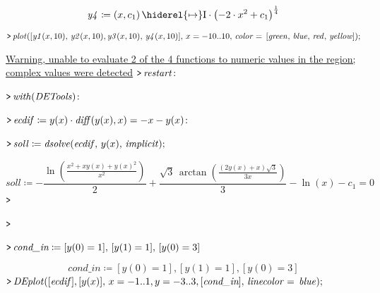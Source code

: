 \documentclass{article}
\begin{document}
\begin{dmath}\label{(10)}
\mathit{y4} \coloneqq \left(x ,c_{1}\right)\hiderel{\mapsto }\mathrm{I}\cdot \left(-2\cdot x^{2}+c_{1}\right)^{\frac{1}{4}}
\end{dmath}
\mapleinput
{$ \displaystyle \texttt{>\,} \mathit{plot} ([\mathit{y1} (x ,10),\,\mathit{y2} (x ,10),\mathit{y3} (x ,10),\,\mathit{y4} (x ,10)],\,x =-10..10,\,\mathit{color} =\,[\mathit{green} ,\,\mathit{blue} ,\,\mathit{red} ,\,\mathit{yellow}]); $}

\href{http://www.maplesoft.com/support/help/errors/view.aspx?path=Warning,%20unable%20to%20evaluate%202%20of%20the%204%20functions%20to%20numeric%20values%20in%20the%20region%3B%20complex%20values%20were%20detected}{Warning, unable to evaluate 2 of the 4 functions to numeric values in the region; complex values were detected}%
{}
\mapleinput
{$ \displaystyle \texttt{>\,} \mathit{restart} \colon  $}

\mapleinput
{$ \displaystyle \texttt{>\,} \mathit{with} (\mathit{DETools})\colon  $}

\mapleinput
{$ \displaystyle \texttt{>\,} \mathit{ecdif} \coloneqq y (x)\cdot \mathit{diff} (y (x),x)=-x -y (x)\colon  $}

\mapleinput
{$ \displaystyle \texttt{>\,} \mathit{soll} \coloneqq \mathit{dsolve} (\mathit{ecdif} ,\,y (x),\,\mathit{implicit}); $}

\begin{dmath}\label{(11)}
\mathit{soll} \coloneqq -\frac{\ln \! \left(\frac{x^{2}+x y \left(x \right)+y \left(x \right)^{2}}{x^{2}}\right)}{2}+\frac{\sqrt{3}\, \arctan \! \left(\frac{\left(2 y \left(x \right)+x \right) \sqrt{3}}{3 x}\right)}{3}-\ln \! \left(x \right)-c_{1}=0
\end{dmath}
\mapleinput
{$ \displaystyle \texttt{>\,}  $}

\mapleinput
{$ \displaystyle \texttt{>\,}  $}

\mapleinput
{$ \displaystyle \texttt{>\,} \textit{cond\_in} \coloneqq [y (0)=1],\,[y (1)=1],\,[y (0)=3] $}

\begin{dmath}\label{(12)}
\textit{cond\_in} \coloneqq \left[y \! \left(0\right)=1\right],\left[y \! \left(1\right)=1\right],\left[y \! \left(0\right)=3\right]
\end{dmath}
\mapleinput
{$ \displaystyle \texttt{>\,} \mathit{DEplot} ([\mathit{ecdif}],[y (x)],\,x =-1..1,y =-3..3,[\textit{cond\_in}],\,\mathit{linecolor} =\,\mathit{blue}); $}
\end{document}
